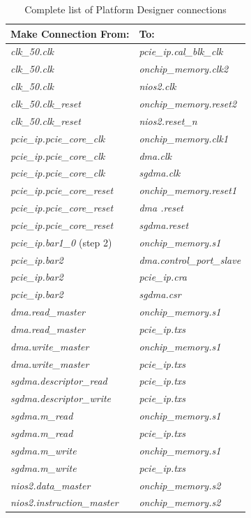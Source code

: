 \documentclass[11pt, twoside, pdftex]{article}
\begin{document}
\begin{enumerate}
\begin{table}[H]
	\centering
	\caption{Complete list of Platform Designer connections}
	\begin{tabular}{| l | l |}
		\hline
		{\bf Make Connection From:} & {\bf To:} \\
		\hline
		{\it clk\_50.clk} & {\it pcie\_ip.cal\_blk\_clk} \\
		\hline
		{\it clk\_50.clk}  & {\it onchip\_memory.clk2}\\
		\hline
		{\it clk\_50.clk} & {\it nios2.clk} \\
		\hline
		{\it clk\_50.clk\_reset} & {\it onchip\_memory.reset2}\\
		\hline
		{\it clk\_50.clk\_reset} & {\it nios2.reset\_n} \\
		\hline
		{\it pcie\_ip.pcie\_core\_clk}  & {\it onchip\_memory.clk1}  \\
		\hline
		{\it pcie\_ip.pcie\_core\_clk}  & {\it dma.clk}  \\
		\hline
		{\it pcie\_ip.pcie\_core\_clk}  & {\it sgdma.clk}  \\
		\hline
		{\it pcie\_ip.pcie\_core\_reset} & {\it onchip\_memory.reset1} \\
		\hline
		{\it pcie\_ip.pcie\_core\_reset} & {\it dma .reset}  \\
		\hline
		{\it pcie\_ip.pcie\_core\_reset} & {\it sgdma.reset}  \\
		\hline
		{\it pcie\_ip.bar1\_0} (step 2) & {\it onchip\_memory.s1}  \\
		\hline
		{\it pcie\_ip.bar2}& {\it dma.control\_port\_slave} \\
		\hline
		{\it pcie\_ip.bar2}  & {\it pcie\_ip.cra} \\
		\hline
		{\it pcie\_ip.bar2}  & {\it sgdma.csr}  \\		
		\hline
		{\it dma.read\_master}  & {\it onchip\_memory.s1} \\
		\hline
		{\it dma.read\_master}  & {\it pcie\_ip.txs}  \\
		\hline
		{\it dma.write\_master}  & {\it onchip\_memory.s1}  \\
		\hline
		{\it dma.write\_master} & {\it pcie\_ip.txs}  \\
		\hline
		{\it sgdma.descriptor\_read}  & {\it pcie\_ip.txs} \\
		\hline
		{\it sgdma.descriptor\_write}  & {\it pcie\_ip.txs}  \\
		\hline
		{\it sgdma.m\_read} & {\it onchip\_memory.s1}\\
		\hline
		{\it sgdma.m\_read}  & {\it pcie\_ip.txs}  \\
		\hline
		{\it sgdma.m\_write}  & {\it onchip\_memory.s1}\\
		\hline
		{\it sgdma.m\_write} & {\it pcie\_ip.txs}  \\
		\hline
		{\it nios2.data\_master} & {\it onchip\_memory.s2} \\
		\hline
		{\it nios2.instruction\_master} & {\it onchip\_memory.s2} \\
		\hline
	\end{tabular}
	\label{tab:qsys_connections}
\end{table}
	

\end{enumerate}
\end{document}
